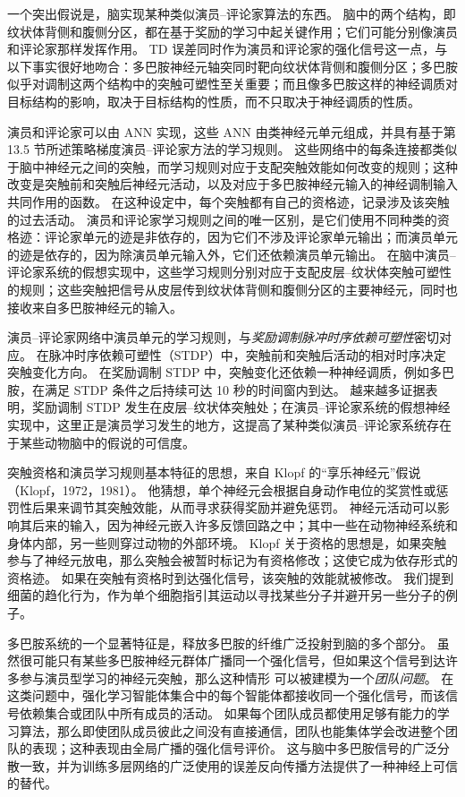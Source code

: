 \documentclass[UTF8, 12pt, fontset=fandol, oneside]{ctexart}
\begin{document}
一个突出假说是，脑实现某种类似演员--评论家算法的东西。
脑中的两个结构，即纹状体背侧和腹侧分区，都在基于奖励的学习中起关键作用；它们可能分别像演员和评论家那样发挥作用。
TD 误差同时作为演员和评论家的强化信号这一点，与以下事实很好地吻合：多巴胺神经元轴突同时靶向纹状体背侧和腹侧分区；多巴胺似乎对调制这两个结构中的突触可塑性至关重要；而且像多巴胺这样的神经调质对目标结构的影响，取决于目标结构的性质，而不只取决于神经调质的性质。

演员和评论家可以由 ANN 实现，这些 ANN 由类神经元单元组成，并具有基于第 13.5 节所述策略梯度演员--评论家方法的学习规则。
这些网络中的每条连接都类似于脑中神经元之间的突触，而学习规则对应于支配突触效能如何改变的规则；这种改变是突触前和突触后神经元活动，以及对应于多巴胺神经元输入的神经调制输入共同作用的函数。
在这种设定中，每个突触都有自己的资格迹，记录涉及该突触的过去活动。
演员和评论家学习规则之间的唯一区别，是它们使用不同种类的资格迹：评论家单元的迹是非依存的，因为它们不涉及评论家单元输出；而演员单元的迹是依存的，因为除演员单元输入外，它们还依赖演员单元输出。
在脑中演员--评论家系统的假想实现中，这些学习规则分别对应于支配皮层--纹状体突触可塑性的规则；这些突触把信号从皮层传到纹状体背侧和腹侧分区的主要神经元，同时也接收来自多巴胺神经元的输入。

演员--评论家网络中演员单元的学习规则，与\emph{奖励调制脉冲时序依赖可塑性}密切对应。
在脉冲时序依赖可塑性（STDP）中，突触前和突触后活动的相对时序决定突触变化方向。
在奖励调制 STDP 中，突触变化还依赖一种神经调质，例如多巴胺，在满足 STDP 条件之后持续可达 10 秒的时间窗内到达。
越来越多证据表明，奖励调制 STDP 发生在皮层--纹状体突触处；在演员--评论家系统的假想神经实现中，这里正是演员学习发生的地方，这提高了某种类似演员--评论家系统存在于某些动物脑中的假说的可信度。

突触资格和演员学习规则基本特征的思想，来自 Klopf 的“享乐神经元”假说（Klopf，1972，1981）。
他猜想，单个神经元会根据自身动作电位的奖赏性或惩罚性后果来调节其突触效能，从而寻求获得奖励并避免惩罚。
神经元活动可以影响其后来的输入，因为神经元嵌入许多反馈回路之中；其中一些在动物神经系统和身体内部，另一些则穿过动物的外部环境。
Klopf 关于资格的思想是，如果突触参与了神经元放电，那么突触会被暂时标记为有资格修改；这使它成为依存形式的资格迹。
如果在突触有资格时到达强化信号，该突触的效能就被修改。
我们提到细菌的趋化行为，作为单个细胞指引其运动以寻找某些分子并避开另一些分子的例子。

多巴胺系统的一个显著特征是，释放多巴胺的纤维广泛投射到脑的多个部分。
虽然很可能只有某些多巴胺神经元群体广播同一个强化信号，但如果这个信号到达许多参与演员型学习的神经元突触，那么这种情形
可以被建模为一个\emph{团队问题}。
在这类问题中，强化学习智能体集合中的每个智能体都接收同一个强化信号，而该信号依赖集合或团队中所有成员的活动。
如果每个团队成员都使用足够有能力的学习算法，那么即使团队成员彼此之间没有直接通信，团队也能集体学会改进整个团队的表现；这种表现由全局广播的强化信号评价。
这与脑中多巴胺信号的广泛分散一致，并为训练多层网络的广泛使用的误差反向传播方法提供了一种神经上可信的替代。
\end{document}
